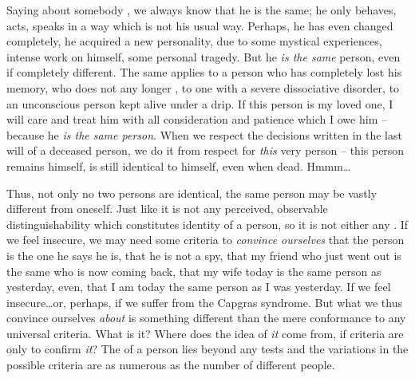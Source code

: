 Saying about somebody , we always know that he is the
same; he only behaves, acts, speaks in a way which is not his usual way.
Perhaps, he has even changed completely, he acquired a new personality, due to
some mystical experiences, intense work on himself, some personal tragedy.  But
he {\em is the same} person, even if completely different.  The same applies to
a person who has completely lost his memory, who does not any longer , to one with a severe dissociative disorder, to an
unconscious person kept alive under a drip.  If this person is my loved one, I
will care and treat him with all consideration and patience which I owe him --
because he {\em is the same person}.  When we respect the decisions written in
the last will of a deceased person, we do it from respect for {\em this} very
person -- this person remains himself, is still identical to himself, even when
dead.  Hmmm\ldots

Thus, not only no two persons are identical, the same person may be vastly
different from oneself.  Just like it is not any  perceived,
observable distinguishability which constitutes identity of a person, so it is
not either any .  If we feel insecure, we may need some
criteria to {\em convince ourselves} that the person is the one he says he is,
that he is not a spy, that my friend who just went out is the same who is now
coming back, that my wife today is the same person as yesterday, even, that I am
today the same person as I was yesterday.  If we feel
insecure\ldots or, perhaps, if we suffer from the Capgras syndrome. But what we
thus convince ourselves {\em about} is something different than the mere
conformance to any universal criteria.  What is it?  Where does the idea of {\em
  it} come from, if criteria are only to confirm {\em it}?  The  of a
person lies beyond any tests and the variations in the possible criteria are as
numerous as the number of different people.

